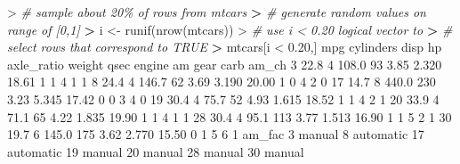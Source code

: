 \documentclass[
]{book}
\newenvironment{Shaded}{\begin{snugshade}}{\end{snugshade}}
\newcommand{\CommentTok}[1]{\textcolor[rgb]{0.56,0.35,0.01}{\textit{#1}}}
\newcommand{\DecValTok}[1]{\textcolor[rgb]{0.00,0.00,0.81}{#1}}
\newcommand{\ErrorTok}[1]{\textcolor[rgb]{0.64,0.00,0.00}{\textbf{#1}}}
\newcommand{\FloatTok}[1]{\textcolor[rgb]{0.00,0.00,0.81}{#1}}
\newcommand{\FunctionTok}[1]{\textcolor[rgb]{0.00,0.00,0.00}{#1}}
\newcommand{\NormalTok}[1]{#1}
\newcommand{\OtherTok}[1]{\textcolor[rgb]{0.56,0.35,0.01}{#1}}
\newcommand{\SpecialCharTok}[1]{\textcolor[rgb]{0.00,0.00,0.00}{#1}}
\begin{document}
\begin{Shaded}
\begin{Highlighting}[]
\SpecialCharTok{\textgreater{}} \CommentTok{\# sample about 20\% of rows from mtcars}
\ErrorTok{\textgreater{}} \CommentTok{\# generate random values on range of [0,1]}
\ErrorTok{\textgreater{}}\NormalTok{ i }\OtherTok{\textless{}{-}} \FunctionTok{runif}\NormalTok{(}\FunctionTok{nrow}\NormalTok{(mtcars))}
\SpecialCharTok{\textgreater{}} \CommentTok{\# use i \textless{} 0.20 logical vector to }
\ErrorTok{\textgreater{}} \CommentTok{\# select rows that correspond to TRUE}
\ErrorTok{\textgreater{}}\NormalTok{ mtcars[i }\SpecialCharTok{\textless{}} \FloatTok{0.20}\NormalTok{,]}
\NormalTok{    mpg cylinders  disp  hp axle\_ratio weight  qsec engine am gear carb am\_ch}
\DecValTok{3}  \FloatTok{22.8}         \DecValTok{4} \FloatTok{108.0}  \DecValTok{93}       \FloatTok{3.85}  \FloatTok{2.320} \FloatTok{18.61}      \DecValTok{1}  \DecValTok{1}    \DecValTok{4}    \DecValTok{1}     \DecValTok{1}
\DecValTok{8}  \FloatTok{24.4}         \DecValTok{4} \FloatTok{146.7}  \DecValTok{62}       \FloatTok{3.69}  \FloatTok{3.190} \FloatTok{20.00}      \DecValTok{1}  \DecValTok{0}    \DecValTok{4}    \DecValTok{2}     \DecValTok{0}
\DecValTok{17} \FloatTok{14.7}         \DecValTok{8} \FloatTok{440.0} \DecValTok{230}       \FloatTok{3.23}  \FloatTok{5.345} \FloatTok{17.42}      \DecValTok{0}  \DecValTok{0}    \DecValTok{3}    \DecValTok{4}     \DecValTok{0}
\DecValTok{19} \FloatTok{30.4}         \DecValTok{4}  \FloatTok{75.7}  \DecValTok{52}       \FloatTok{4.93}  \FloatTok{1.615} \FloatTok{18.52}      \DecValTok{1}  \DecValTok{1}    \DecValTok{4}    \DecValTok{2}     \DecValTok{1}
\DecValTok{20} \FloatTok{33.9}         \DecValTok{4}  \FloatTok{71.1}  \DecValTok{65}       \FloatTok{4.22}  \FloatTok{1.835} \FloatTok{19.90}      \DecValTok{1}  \DecValTok{1}    \DecValTok{4}    \DecValTok{1}     \DecValTok{1}
\DecValTok{28} \FloatTok{30.4}         \DecValTok{4}  \FloatTok{95.1} \DecValTok{113}       \FloatTok{3.77}  \FloatTok{1.513} \FloatTok{16.90}      \DecValTok{1}  \DecValTok{1}    \DecValTok{5}    \DecValTok{2}     \DecValTok{1}
\DecValTok{30} \FloatTok{19.7}         \DecValTok{6} \FloatTok{145.0} \DecValTok{175}       \FloatTok{3.62}  \FloatTok{2.770} \FloatTok{15.50}      \DecValTok{0}  \DecValTok{1}    \DecValTok{5}    \DecValTok{6}     \DecValTok{1}
\NormalTok{      am\_fac}
\DecValTok{3}\NormalTok{     manual}
\DecValTok{8}\NormalTok{  automatic}
\DecValTok{17}\NormalTok{ automatic}
\DecValTok{19}\NormalTok{    manual}
\DecValTok{20}\NormalTok{    manual}
\DecValTok{28}\NormalTok{    manual}
\DecValTok{30}\NormalTok{    manual}
\end{Highlighting}
\end{Shaded}
\end{document}
